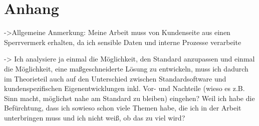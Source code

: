 \chapter{Anhang}

->Allgemeine Anmerkung: Meine Arbeit muss von Kundenseite aus einen Sperrvermerk erhalten, da ich sensible Daten und interne Prozesse verarbeite

-> Ich analysiere ja einmal die Möglichkeit, den Standard anzupassen und einmal die Möglichkeit, eine maßgeschneiderte Lösung zu entwickeln, muss ich dadurch im Theorieteil auch auf den Unterschied zwischen Standardsoftware und kundenspezifischen Eigenentwicklungen inkl. Vor- und Nachteile (wieso es z.B. Sinn macht, möglichst nahe am Standard zu bleiben) eingehen? Weil ich habe die Befürchtung, dass ich sowieso schon viele Themen habe, die ich in der Arbeit unterbringen muss und ich nicht weiß, ob das zu viel wird?